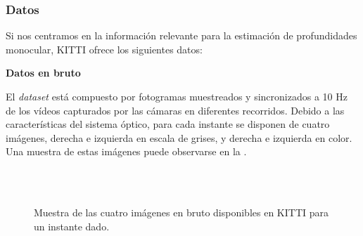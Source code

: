 \subsubsection{Datos}
Si nos centramos en la información relevante para la estimación de profundidades monocular, KITTI ofrece los siguientes datos:

\textbf{Datos en bruto}

El \textit{dataset} está compuesto por fotogramas muestreados y sincronizados a 10 Hz de los vídeos capturados por las cámaras en diferentes recorridos. Debido a las características del sistema óptico, para cada instante se disponen de cuatro imágenes, derecha e izquierda en escala de grises, y derecha e izquierda en color. Una muestra de estas imágenes puede observarse en la .

\begin{figure}[H]
\centering
\hfil
	\\[-2ex]

\hfil
	\\[-2ex]
	
\caption{Muestra de las cuatro imágenes en bruto disponibles en KITTI para un instante dado.}
\label{fig:kitti-raw}
\end{figure}

